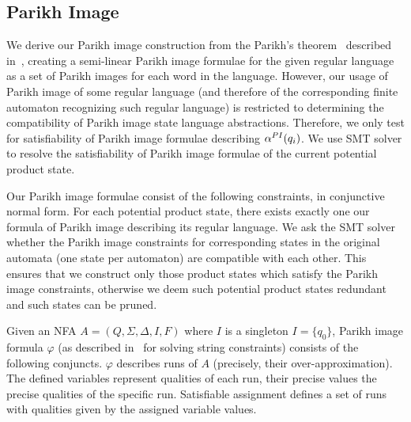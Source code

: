 \subsection{Parikh Image} \label{sec:parikhImage}

We derive our Parikh image construction from the Parikh's theorem~\cite{Kozen1977} described in~\cite{ParikhsTheoremSimpleAndDirectConstruction}, creating a semi-linear Parikh image formulae for the given regular language as a set of Parikh images for each word in the language. However, our usage of Parikh image of some regular language (and therefore of the corresponding finite automaton recognizing such regular language) is restricted to determining the compatibility of Parikh image state language abstractions. Therefore, we only test for satisfiability of Parikh image formulae describing $\alpha^{PI}(q_i)$. We use SMT solver to resolve the satisfiability of Parikh image formulae of the current potential product state.

Our Parikh image formulae consist of the following constraints, in conjunctive normal form. For each potential product state, there exists exactly one our formula of Parikh image describing its regular language. We ask the SMT solver whether the Parikh image constraints for corresponding states in the original automata (one state per automaton) are compatible with each other. This ensures that we construct only those product states which satisfy the Parikh image constraints, otherwise we deem such potential product states redundant and such states can be pruned.

Given an NFA $A = (Q, \Sigma, \Delta, I, F)$ where $I$ is a singleton $I = \{ q_{0} \}$, Parikh image formula $\varphi$ (as described in~\cite{PI_computation/10.1007/978-3-030-45093-9_59} for solving string constraints) consists of the following conjuncts. $\varphi$ describes runs of $A$ (precisely, their over-approximation). The defined variables represent qualities of each run, their precise values the precise qualities of the specific run. Satisfiable assignment defines a set of runs with qualities given by the assigned variable values.

